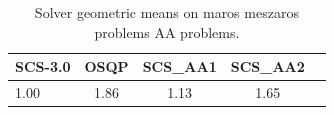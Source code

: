 \begin{table}
\centering
\caption{Solver geometric means on maros meszaros problems AA problems.}
\label{t-maros meszaros problems AA-geom_mean}
\begin{tabular}{lcccc}
\toprule
 SCS-3.0 &  OSQP &  SCS\_AA1 &  SCS\_AA2 \\
\midrule
    1.00 &  1.86 &     1.13 &     1.65 \\
\bottomrule
\end{tabular}
\end{table}
